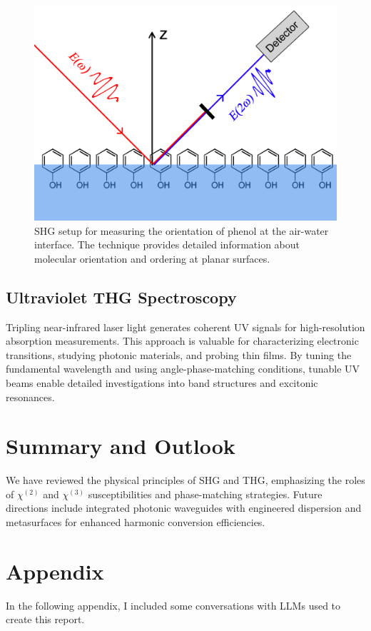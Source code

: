 \documentclass[9pt,a4paper,twocolumn,twoside]{tau-class/tau}
\begin{document}
\begin{figure}[h!]
\centering
\includegraphics[width=0.7\columnwidth]{figures/SHG_phenol_air-water.png}
\caption{SHG setup for measuring the orientation of phenol at the air-water interface. The technique provides detailed information about molecular orientation and ordering at planar surfaces.\cite{Swk2118Image}}
\end{figure}

\subsection{Ultraviolet THG Spectroscopy}
Tripling near-infrared laser light generates coherent UV signals for high-resolution absorption measurements. This approach is valuable for characterizing electronic transitions, studying photonic materials, and probing thin films. By tuning the fundamental wavelength and using angle-phase-matching conditions, tunable UV beams enable detailed investigations into band structures and excitonic resonances.

\section{Summary and Outlook}
We have reviewed the physical principles of SHG and THG, emphasizing the roles of $\chi^{(2)}$ and $\chi^{(3)}$ susceptibilities and phase-matching strategies. Future directions include integrated photonic waveguides with engineered dispersion and metasurfaces for enhanced harmonic conversion efficiencies.
	
    


\printbibliography %


\section*{Appendix}
In the following appendix, I included some conversations with LLMs used to create this report.




\end{document}
